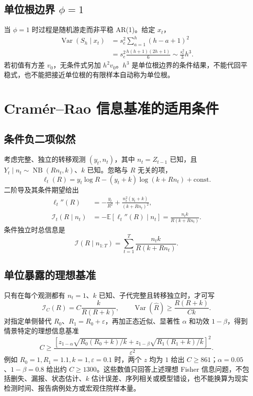 \documentclass[11pt,a4paper]{article}
\theoremstyle{remark}
\newcommand{\E}{\mathbb{E}}
\newcommand{\Var}{\operatorname{Var}}
\begin{document}
\subsection{单位根边界 \texorpdfstring{$\phi=1$}{phi=1}}
当 $\phi=1$ 时过程是随机游走而非平稳 AR(1)。给定 $x_t$，
\begin{align}
\Var(S_h\mid x_t)
&=s_e^2\sum_{a=1}^h(h-a+1)^2\nonumber\\
&=s_e^2\frac{h(h+1)(2h+1)}6
\sim\frac{s_e^2}{3}h^3.\label{eq:ar_unit}
\end{align}
若初值有方差 $v_0$，无条件式另加 $h^2v_0$。$h^3$ 是单位根边界的条件结果，不能代回平稳式，也不能把接近单位根的有限样本自动称为单位根。

\section{Cramér--Rao 信息基准的适用条件}
\subsection{条件负二项似然}
考虑完整、独立的转移观测 $(y_t,n_t)$，其中 $n_t=Z_{t-1}$ 已知，且
$Y_t\mid n_t\sim\operatorname{NB}(Rn_t,k)$、$k$ 已知。忽略与 $R$ 无关的项，
\begin{equation}
\ell_t(R)=y_t\log R-(y_t+k)\log(k+Rn_t)+\mathrm{const}.
\end{equation}
二阶导及其条件期望给出
\begin{align}
\ell_t''(R)&=-\frac{y_t}{R^2}+\frac{n_t^2(y_t+k)}{(k+Rn_t)^2},\\
\mathcal I_t(R\mid n_t)&=-\E[\ell_t''(R)\mid n_t]
=\frac{n_tk}{R(k+Rn_t)}.\label{eq:crb_general}
\end{align}
条件独立时总信息是
\begin{equation}
\mathcal I(R\mid n_{1:T})=\sum_{t=1}^T\frac{n_tk}{R(k+Rn_t)}.\label{eq:crb_sum}
\end{equation}

\subsection{单位暴露的理想基准}
只有在每个观测都有 $n_t=1$、$k$ 已知、子代完整且转移独立时，才可写
\begin{equation}
\mathcal I_C(R)=C\frac{k}{R(R+k)},\qquad
\Var(\widehat R)\ge\frac{R(R+k)}{Ck}.\label{eq:crb_unit}
\end{equation}
对指定单侧替代 $R_0$、$R_1=R_0+\varepsilon$，再加正态近似、显著性 $\alpha$ 和功效 $1-\beta$，得到情景特定的理想信息基准
\begin{equation}
C\ge\frac{\left[z_{1-\alpha}\sqrt{R_0(R_0+k)/k}
+z_{1-\beta}\sqrt{R_1(R_1+k)/k}\right]^2}{\varepsilon^2}.
\label{eq:crb_power}
\end{equation}
例如 $R_0=1,R_1=1.1,k=1,\varepsilon=0.1$ 时，两个 $z$ 均为 $1$ 给出 $C\ge861$；$\alpha=0.05$、$1-\beta=0.8$ 给出约 $C\ge1300$。这些数值只回答上述理想 Fisher 信息问题，不包括删失、漏报、状态估计、$k$ 估计误差、序列相关或模型错设，也不能换算为现实检测时间、报告病例处方或宏观住院样本量。
\end{document}

